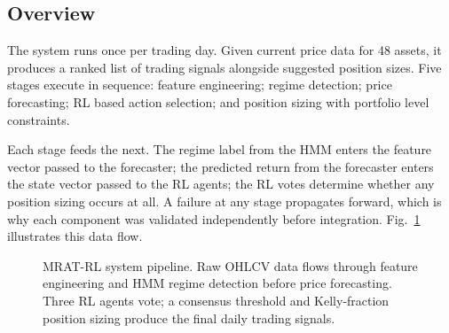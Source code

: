 \documentclass[journal]{IEEEtran}
\begin{document}
\subsection{Overview}

The system runs once per trading day. Given current price data for 48
assets, it produces a ranked list of trading signals alongside suggested
position sizes. Five stages execute in sequence: feature engineering;
regime detection; price forecasting; RL based action selection; and
position sizing with portfolio level constraints.

Each stage feeds the next. The regime label from the HMM enters the
feature vector passed to the forecaster; the predicted return from the
forecaster enters the state vector passed to the RL agents; the RL votes
determine whether any position sizing occurs at all. A failure at any
stage propagates forward, which is why each component was validated
independently before integration. Fig.~\ref{fig:pipeline} illustrates
this data flow.

\begin{figure}[!t]
\centering
{}
\caption{MRAT-RL system pipeline. Raw OHLCV data flows through feature
engineering and HMM regime detection before price forecasting. Three RL
agents vote; a consensus threshold and Kelly-fraction position sizing
produce the final daily trading signals.}
\label{fig:pipeline}
\end{figure}
\end{document}
